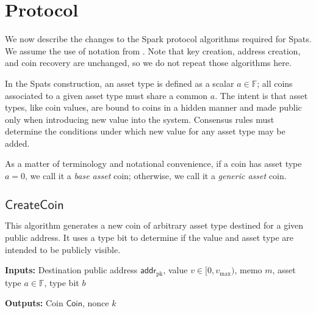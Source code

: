\documentclass{article}
\newcommand{\F}{\mathbb{F}}
\newcommand{\func}[1]{\mathsf{#1}}
\newcommand{\addr}{\func{addr}}
\begin{document}
\section{Protocol}

We now describe the changes to the Spark protocol algorithms required for Spats.
We assume the use of notation from \cite{spark}.
Note that key creation, address creation, and coin recovery are unchanged, so we do not repeat those algorithms here.

In the Spats construction, an asset type is defined as a scalar $a \in \F$; all coins associated to a given asset type must share a common $a$.
The intent is that asset types, like coin values, are bound to coins in a hidden manner and made public only when introducing new value into the system.
Consensus rules must determine the conditions under which new value for any asset type may be added.

As a matter of terminology and notational convenience, if a coin has asset type $a = 0$, we call it a \textit{base asset} coin; otherwise, we call it a \textit{generic asset} coin.

\subsection{\texorpdfstring{$\func{CreateCoin}$}{CreateCoin}}

This algorithm generates a new coin of arbitrary asset type destined for a given public address.
It uses a type bit to determine if the value and asset type are intended to be publicly visible.

\textbf{Inputs:} Destination public address $\addr_{\text{pk}}$, value $v \in [0, v_{\text{max}})$, memo $m$, asset type $a \in \F$, type bit $b$

\textbf{Outputs:} Coin $\func{Coin}$, nonce $k$
\end{document}
